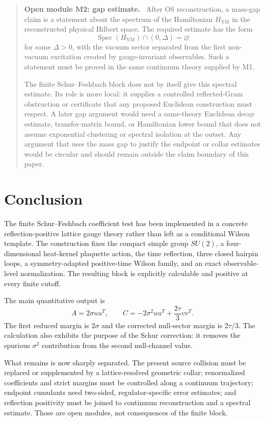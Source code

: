 \documentclass[11pt]{article}
\newenvironment{openmodule}[1]
{\begin{quote}\color{red!55!black}\textbf{Open module #1.}\ }
{\end{quote}}
\begin{document}
\begin{openmodule}{M2: gap estimate}
After OS reconstruction, a mass-gap claim is a statement about the spectrum of the Hamiltonian \(H_{\mathrm{YM}}\) in the reconstructed physical Hilbert space.  The required estimate has the form
\[
  \operatorname{Spec}(H_{\mathrm{YM}})\cap(0,\Delta)=\varnothing
\]
for some \(\Delta>0\), with the vacuum sector separated from the first non-vacuum excitation created by gauge-invariant observables.  Such a statement must be proved in the same continuum theory supplied by M1.

The finite Schur--Feshbach block does not by itself give this spectral estimate.  Its role is more local: it supplies a controlled reflected-Gram obstruction or certificate that any proposed Euclidean construction must respect.  A later gap argument would need a same-theory Euclidean decay estimate, transfer-matrix bound, or Hamiltonian lower bound that does not assume exponential clustering or spectral isolation at the outset.  Any argument that uses the mass gap to justify the endpoint or collar estimates would be circular and should remain outside the claim boundary of this paper.
\end{openmodule}

\section{Conclusion}

The finite Schur--Feshbach coefficient test has been implemented in a concrete reflection-positive lattice gauge theory rather than left as a conditional Wilson template.  The construction fixes the compact simple group $SU(2)$, a four-dimensional heat-kernel plaquette action, the time reflection, three closed hairpin loops, a symmetry-adapted positive-time Wilson family, and an exact observable-level normalization.  The resulting block is explicitly calculable and positive at every finite cutoff.

The main quantitative output is
\[
  A=2\sigma uu^T,
  \qquad
  C=-2\sigma^2uu^T+\frac{2\tau}{3}vv^T.
\]
The first reduced margin is $2\sigma$ and the corrected null-sector margin is $2\tau/3$.  The calculation also exhibits the purpose of the Schur correction: it removes the spurious $\sigma^2$ contribution from the second null-channel value.

What remains is now sharply separated.  The present source collision must be replaced or supplemented by a lattice-resolved geometric collar; renormalized coefficients and strict margins must be controlled along a continuum trajectory; endpoint cumulants need two-sided, regulator-specific error estimates; and reflection positivity must be joined to continuum reconstruction and a spectral estimate.  Those are open modules, not consequences of the finite block.
\end{document}
